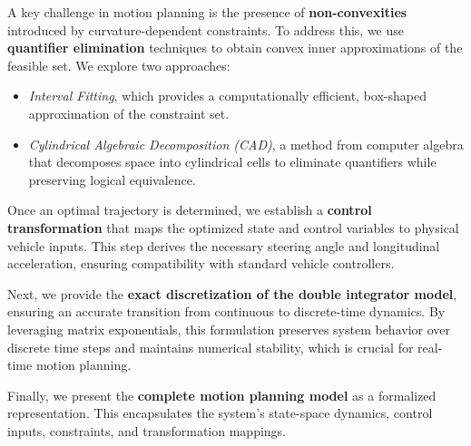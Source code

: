 A key challenge in motion planning is the presence of \textbf{non-convexities} introduced by curvature-dependent constraints.
To address this, we use \textbf{quantifier elimination} techniques to obtain convex inner approximations of the feasible set.
We explore two approaches:
\begin{itemize}
	\item \textit{Interval Fitting}, which provides a computationally efficient, box-shaped approximation of the constraint set.
	\item \textit{Cylindrical Algebraic Decomposition (CAD)}, a method from computer algebra that decomposes space into cylindrical cells to eliminate quantifiers while preserving logical equivalence.
\end{itemize}

Once an optimal trajectory is determined, we establish a \textbf{control transformation} that maps the optimized state and control variables to
physical vehicle inputs.
This step derives the necessary steering angle and longitudinal acceleration, ensuring compatibility with standard vehicle controllers.

Next, we provide the \textbf{exact discretization of the double integrator model}, ensuring an accurate transition from continuous to discrete-time
dynamics.
By leveraging matrix exponentials, this formulation preserves system behavior over discrete time steps and maintains numerical stability, which is
crucial for real-time motion planning.

Finally, we present the \textbf{complete motion planning model} as a formalized representation.
This encapsulates the system's state-space dynamics, control inputs, constraints, and transformation mappings.



